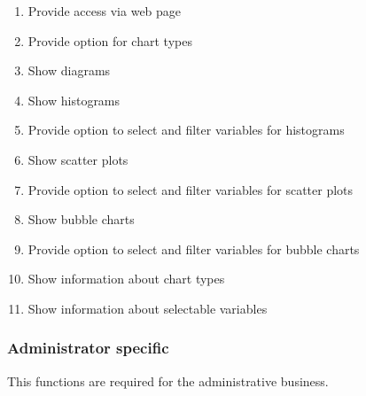 \begin{enumerate}[label={{/F}\itemnumber*{/}}, series=func]
  \item Provide access via web page \label{f1}
    
  \item Provide option for chart types \label{f2}
  
  \item Show diagrams \label{f3}
  
  \item Show histograms \label{f4} %
    
  
  \item Provide option to select and filter variables for histograms \label{f6}
  
  
  \item Show scatter plots \label{f7} %
  
  
  \item Provide option to select and filter variables for scatter plots \label{f9} 
  
  \item Show bubble charts \label{f10} %
  
 \item Provide option to select and filter variables for bubble charts \label{f11}
  
  
  \item Show information about chart types \label{f13}
  
  \item Show information about selectable variables\label{f14}
  
  
\end{enumerate}


\subsubsection*{Administrator specific}
This functions are required for the administrative business.

